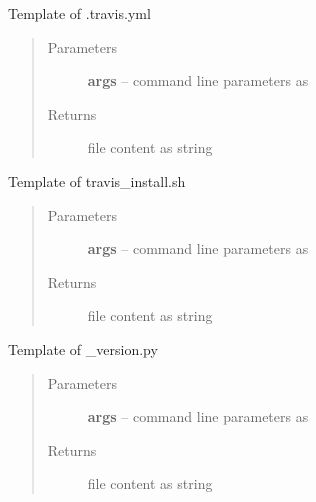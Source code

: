 \documentclass[letterpaper,10pt,english]{sphinxmanual}
\begin{document}

\begin{fulllineitems}
\label{_rst/pyscaffold:pyscaffold.templates.travis}
Template of .travis.yml
\begin{quote}\begin{description}
\item[{Parameters}] \leavevmode
\textbf{args} -- command line parameters as \href{http://docs.python.org/2.7/library/argparse.html\#argparse.Namespace}{}

\item[{Returns}] \leavevmode
file content as string

\end{description}\end{quote}

\end{fulllineitems}


\begin{fulllineitems}
\label{_rst/pyscaffold:pyscaffold.templates.travis_install}
Template of travis\_install.sh
\begin{quote}\begin{description}
\item[{Parameters}] \leavevmode
\textbf{args} -- command line parameters as \href{http://docs.python.org/2.7/library/argparse.html\#argparse.Namespace}{}

\item[{Returns}] \leavevmode
file content as string

\end{description}\end{quote}

\end{fulllineitems}


\begin{fulllineitems}
\label{_rst/pyscaffold:pyscaffold.templates.version}
Template of \_version.py
\begin{quote}\begin{description}
\item[{Parameters}] \leavevmode
\textbf{args} -- command line parameters as \href{http://docs.python.org/2.7/library/argparse.html\#argparse.Namespace}{}

\item[{Returns}] \leavevmode
file content as string

\end{description}\end{quote}

\end{fulllineitems}
\end{document}
